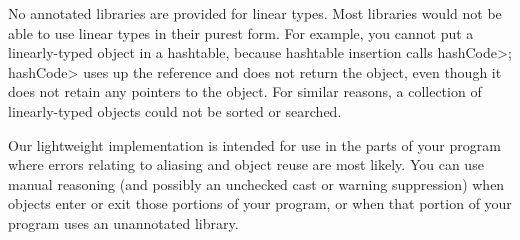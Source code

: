No annotated libraries are provided for linear types.  Most libraries would
not be able to use linear types in their purest form.  For example, you
cannot put a linearly-typed object in a hashtable, because hashtable
insertion calls \<hashCode>; \<hashCode> uses up the reference and does not
return the object, even though it does not retain any pointers to the
object.  For similar reasons, a collection of linearly-typed objects could
not be sorted or searched.

Our lightweight implementation is intended for use in the parts of your
program where errors relating to aliasing and object reuse are most likely.
You can use manual reasoning (and possibly an unchecked cast or warning
suppression) when objects enter or exit those portions of your program, or
when that portion of your program uses an unannotated library.


